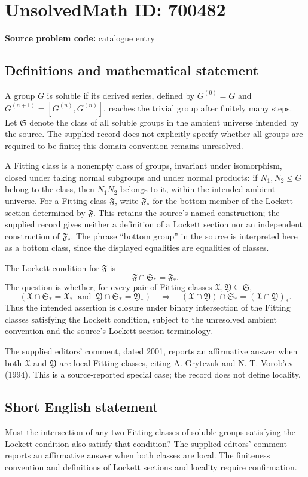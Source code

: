 \documentclass[11pt]{article}
\begin{document}
\section*{UnsolvedMath ID: 700482}
\textbf{Source problem code:} catalogue entry
\subsection{Definitions and mathematical statement}
A group \(G\) is soluble if its derived series, defined by \(G^{(0)}=G\) and \(G^{(n+1)}=[G^{(n)},G^{(n)}]\), reaches the trivial group after finitely many steps. Let \(\mathfrak S\) denote the class of all soluble groups in the ambient universe intended by the source. The supplied record does not explicitly specify whether all groups are required to be finite; this domain convention remains unresolved.

A Fitting class is a nonempty class of groups, invariant under isomorphism, closed under taking normal subgroups and under normal products: if \(N_1,N_2\trianglelefteq G\) belong to the class, then \(N_1N_2\) belongs to it, within the intended ambient universe. For a Fitting class \(\mathfrak F\), write \(\mathfrak F_*\) for the bottom member of the Lockett section determined by \(\mathfrak F\). This retains the source's named construction; the supplied record gives neither a definition of a Lockett section nor an independent construction of \(\mathfrak F_*\). The phrase ``bottom group'' in the source is interpreted here as a bottom class, since the displayed equalities are equalities of classes.

The Lockett condition for \(\mathfrak F\) is
\[
\mathfrak F\cap\mathfrak S_*=\mathfrak F_*.
\]
The question is whether, for every pair of Fitting classes \(\mathfrak X,\mathfrak Y\subseteq\mathfrak S\),
\[
\left(\mathfrak X\cap\mathfrak S_*=\mathfrak X_*\ \text{ and }\ \mathfrak Y\cap\mathfrak S_*=\mathfrak Y_*\right)
\quad\Longrightarrow\quad
(\mathfrak X\cap\mathfrak Y)\cap\mathfrak S_*=(\mathfrak X\cap\mathfrak Y)_*.
\]
Thus the intended assertion is closure under binary intersection of the Fitting classes satisfying the Lockett condition, subject to the unresolved ambient convention and the source's Lockett-section terminology.

The supplied editors' comment, dated 2001, reports an affirmative answer when both \(\mathfrak X\) and \(\mathfrak Y\) are local Fitting classes, citing A. Grytczuk and N. T. Vorob'ev (1994). This is a source-reported special case; the record does not define locality.
\subsection{Short English statement}
Must the intersection of any two Fitting classes of soluble groups satisfying the Lockett condition also satisfy that condition? The supplied editors' comment reports an affirmative answer when both classes are local. The finiteness convention and definitions of Lockett sections and locality require confirmation.
\end{document}
